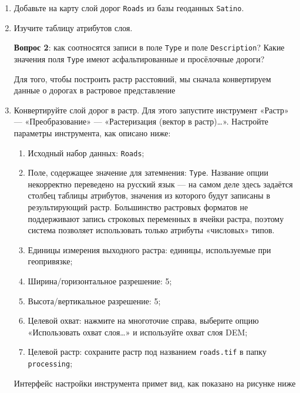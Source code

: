 \documentclass[
  12pt,
]{book}
\begin{document}
\begin{enumerate}
\def\labelenumi{\arabic{enumi}.}
\item
  Добавьте на карту слой дорог \texttt{Roads} из базы геоданных \texttt{Satino}.
\item
  Изучите таблицу атрибутов слоя.

  \textbf{Вопрос 2}: как соотносятся записи в поле \texttt{Type} и поле \texttt{Description}? Какие значения поля \texttt{Type} имеют асфальтированные и просёлочные дороги?

  Для того, чтобы построить растр расстояний, мы сначала конвертируем данные о дорогах в растровое представление
\item
  Конвертируйте слой дорог в растр. Для этого запустите инструмент «Растр» --- «Преобразование» --- «Растеризация (вектор в растр)\ldots». Настройте параметры инструмента, как описано ниже:

  \begin{enumerate}
  \def\labelenumii{\alph{enumii}.}
  \item
    Исходный набор данных: \texttt{Roads};
  \item
    Поле, содержащее значение для затемнения: \texttt{Type}. Название опции некорректно переведено на русский язык --- на самом деле здесь задаётся столбец таблицы атрибутов, значения из которого будут записаны в результирующий растр. Большинство растровых форматов не поддерживают запись строковых переменных в ячейки растра, поэтому система позволяет использовать только атрибуты «числовых» типов.
  \item
    Единицы измерения выходного растра: единицы, используемые при геопривязке;
  \item
    Ширина/горизонтальное разрешение: 5;
  \item
    Высота/вертикальное разрешение: 5;
  \item
    Целевой охват: нажмите на многоточие справа, выберите опцию «Использовать охват слоя\ldots» и используйте охват слоя DEM;
  \item
    Целевой растр: сохраните растр под названием \texttt{roads.tif} в папку \texttt{processing};
  \end{enumerate}

  Интерфейс настройки инструмента примет вид, как показано на рисунке ниже


\end{enumerate}
\end{document}
